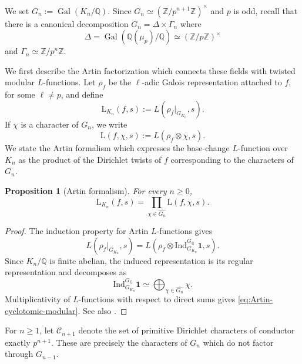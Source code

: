 \documentclass[11pt,table]{amsart}
\newtheorem{proposition}[theorem]{Proposition}
\newcommand{\Gal}{\op{Gal}}
\newcommand{\Z}{\mathbb{Z}}
\newcommand{\Q}{\mathbb{Q}}
\newcommand{\op}[1]{\operatorname{#1}}
\numberwithin{equation}{section}
\begin{document}
\par We set $G_n:=\Gal(K_n/\Q)$. Since $G_n\simeq(\Z/p^{n+1}\Z)^\times$
and \(p\) is odd, recall that there is a canonical decomposition $G_n=\Delta\times\Gamma_n$
where \[\Delta
        =
        \Gal(\Q(\mu_p)/\Q)
        \simeq
        (\Z/p\Z)^\times\]
and $\Gamma_n\simeq\Z/p^n\Z$.

\par We first describe the Artin factorization which connects these fields
with twisted modular \(L\)-functions.  Let \(\rho_f\) be the
\(\ell\)-adic Galois representation attached to \(f\), for some
\(\ell\neq p\), and define
\[
        \mathrm{L}_{K_n}(f,s)
        :=
        L(\rho_f|_{G_{K_n}},s).
\]
If \(\chi\) is a character of \(G_n\), we write
\[
        \mathrm{L}(f,\chi,s)
        :=
        L(\rho_f\otimes\chi,s).
\]
We state the Artin formalism which expresses the base-change $L$-function over $K_n$ as the product of the Dirichlet twists of $f$ corresponding to the characters of $G_n$.

\begin{proposition}[Artin formalism]
\label{prop:artin-formalism-cyclotomic}
For every \(n\geq0\),
\begin{equation}
\label{eq:Artin-cyclotomic-modular}
        \mathrm{L}_{K_n}(f,s)
        =
        \prod_{\chi\in\widehat{G_n}}
        \mathrm{L}(f,\chi,s).
\end{equation}
\end{proposition}

\begin{proof}
The induction property for Artin \(L\)-functions gives
\[
        L(\rho_f|_{G_{K_n}},s)
        =
        L
        \left(
        \rho_f\otimes
        \mathrm{Ind}_{G_{K_n}}^{G_{\Q}}\mathbf1,
        s
        \right).
\]
Since \(K_n/\Q\) is finite abelian, the induced representation is its
regular representation and decomposes as
\[
        \mathrm{Ind}_{G_{K_n}}^{G_{\Q}}\mathbf1
        \simeq
        \bigoplus_{\chi\in\widehat{G_n}}\chi.
\]
Multiplicativity of \(L\)-functions with respect to direct sums gives
\eqref{eq:Artin-cyclotomic-modular}.  See also
\cite[Proposition~3.8(ii), p.~530]{DeligneConstantes}.
\end{proof}

\par For \(n\geq1\), let $\mathcal C_{n+1}$
denote the set of primitive Dirichlet characters of conductor exactly
\(p^{n+1}\). These are precisely the characters of \(G_n\) which do
not factor through \(G_{n-1}\).
\end{document}
